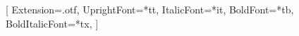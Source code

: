 \documentclass[14pt, russian]{matmex-diploma-custom}
\begin{document}

\maketitle
\setcounter{tocdepth}{2}
\tableofcontents


\pagebreak











\setmonofont{cmun}[
  Extension=.otf,
  UprightFont=*tt,
  ItalicFont=*it,
  BoldFont=*tb,
  BoldItalicFont=*tx,
]


\end{document}
